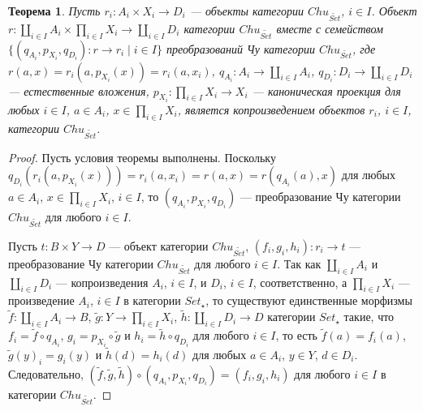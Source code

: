 \documentclass[a4paper,12pt]{article}
\newtheorem{theorem}{Теорема}
\begin{document}
\begin{theorem}\label{coproduct}
    Пусть $r_i: A_i \times X_i \to D_i$ --- объекты категории $Chu_{\widetilde{Set}}$, $i \in I$. Объект $r: \coprod_{i \in I} A_i \times \prod_{i \in I} X_i \to \coprod_{i \in I} D_i$ категории $Chu_{\widetilde{Set}}$ вместе с семейством $\{(q_{A_i},p_{X_i},q_{D_i}): r \to r_i \mid i \in I\}$ преобразований Чу категории $Chu_{\widetilde{Set}}$, где $r(a,x) = r_i(a,p_{X_i}(x)) = r_i(a, x_i)$, $q_{A_i}: A_i \to \coprod_{i \in I} A_i$, $q_{D_i}: D_i \to \coprod_{i \in I} D_i$ --- естественные вложения, $p_{X_i}: \prod_{i \in I} X_i \to X_i$ --- каноническая проекция для любых $i \in I$, $a \in A_i$, $x \in \prod_{i \in I} X_i$, является копроизведением объектов $r_i$, $i \in I$, категории $Chu_{\widetilde{Set}}$.
\end{theorem}
\begin{proof}
    Пусть условия теоремы выполнены. Поскольку $q_{D_i}(r_i(a,p_{X_i}(x))) = r_i(a,x_i) = r(a,x) = r(q_{A_i}(a),x)$ для любых $a \in A_i$, $x \in \prod_{i \in I} X_i$, $i \in I$, то $(q_{A_i}, p_{X_i}, q_{D_i})$ --- преобразование Чу категории $Chu_{\widetilde{Set}}$ для любого $i \in I$.

    Пусть $t: B \times Y \to D$ --- объект категории $Chu_{\widetilde{Set}}$, $(f_i,g_i,h_i): r_i \to t$ --- преобразование Чу категории $Chu_{\widetilde{Set}}$ для любого $i \in I$. Так как $\coprod_{i \in I} A_i$ и $\coprod_{i \in I} D_i$ --- копроизведения $A_i$, $ i \in I$, и $D_i$, $i \in I$, соответственно, а $\prod_{i \in I} X_i$ --- произведение $A_i$, $i \in I$ в категории $Set_{\star}$, то существуют единственные морфизмы $\tilde{f}: \coprod_{i \in I} A_i \to B$, $\tilde{g}: Y \to \prod_{i \in I} X_i$, $\tilde{h}: \coprod_{i \in I} D_i \to D$ категории $Set_{\star}$ такие, что $f_i = \tilde{f} \circ q_{A_i}$, $g_i = p_{X_i} \circ \tilde{g}$ и $h_i = \tilde{h} \circ q_{D_i}$ для любого $i \in I$, то есть $\tilde{f}(a) = f_i(a)$, $\tilde{g}(y)_i = g_i(y)$ и $\tilde{h}(d) = h_i(d)$ для любых $a \in A_i$, $y \in Y$, $d \in D_i$. Следовательно, $(\tilde{f},\tilde{g},\tilde{h}) \circ (q_{A_i}, p_{X_i}, q_{D_i}) = (f_i, g_i, h_i)$ для любого $i \in I$ в категории $Chu_{\widetilde{Set}}$.


\end{proof}
\end{document}

